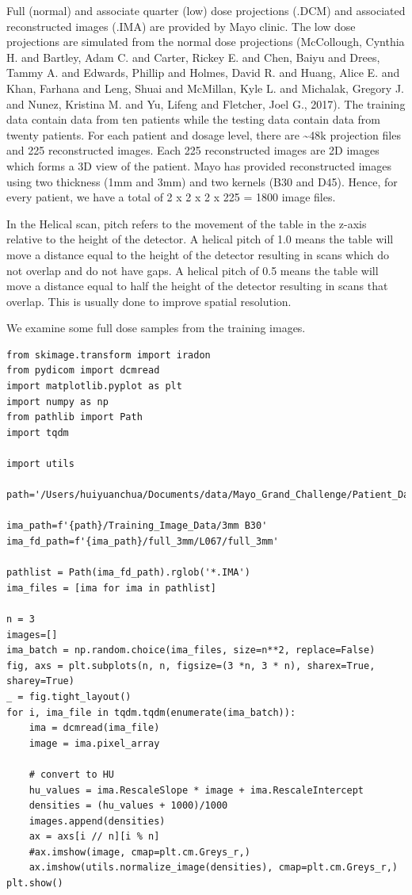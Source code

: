 \documentclass[a4paper, 11pt]{article}
\begin{document}
Full (normal) and associate quarter (low) dose projections (.DCM) and associated reconstructed images (.IMA) are provided by Mayo clinic. The low dose projections are simulated from the normal dose projections (McCollough, Cynthia H. and Bartley, Adam C. and Carter, Rickey E. and Chen, Baiyu and Drees, Tammy A. and Edwards, Phillip and Holmes, David R. and Huang, Alice E. and Khan, Farhana and Leng, Shuai and McMillan, Kyle L. and Michalak, Gregory J. and Nunez, Kristina M. and Yu, Lifeng and Fletcher, Joel G., 2017). The training data contain data from ten patients while the testing data contain data from twenty patients. For each patient and dosage level, there are \textasciitilde{}48k projection files and 225 reconstructed images. Each 225 reconstructed images are 2D images which forms a 3D view of the patient. Mayo has provided reconstructed images using two thickness (1mm and 3mm) and two kernels (B30 and D45). Hence, for every patient, we have a total of 2 x 2 x 2 x 225 = 1800 image files.

In the Helical scan, pitch refers to the movement of the table in the z-axis relative to the height of the detector. A helical pitch of 1.0 means the table will move a distance equal to the height of the detector resulting in scans which do not overlap and do not have gaps. A helical pitch of 0.5 means the table will move a distance equal to half the height of the detector resulting in scans that overlap. This is usually done to improve spatial resolution.

We examine some full dose samples from the training images.
\begin{verbatim}
from skimage.transform import iradon
from pydicom import dcmread
import matplotlib.pyplot as plt
import numpy as np
from pathlib import Path
import tqdm

import utils

path='/Users/huiyuanchua/Documents/data/Mayo_Grand_Challenge/Patient_Data'

ima_path=f'{path}/Training_Image_Data/3mm B30'
ima_fd_path=f'{ima_path}/full_3mm/L067/full_3mm'

pathlist = Path(ima_fd_path).rglob('*.IMA')
ima_files = [ima for ima in pathlist]

n = 3
images=[]
ima_batch = np.random.choice(ima_files, size=n**2, replace=False)
fig, axs = plt.subplots(n, n, figsize=(3 *n, 3 * n), sharex=True, sharey=True)
_ = fig.tight_layout()
for i, ima_file in tqdm.tqdm(enumerate(ima_batch)):
    ima = dcmread(ima_file)
    image = ima.pixel_array

    # convert to HU
    hu_values = ima.RescaleSlope * image + ima.RescaleIntercept
    densities = (hu_values + 1000)/1000
    images.append(densities)
    ax = axs[i // n][i % n]
    #ax.imshow(image, cmap=plt.cm.Greys_r,)
    ax.imshow(utils.normalize_image(densities), cmap=plt.cm.Greys_r,)
plt.show()
\end{verbatim}
\end{document}
